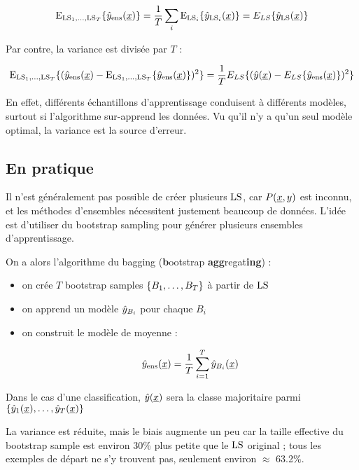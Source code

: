 	$$\text{E}_{\text{LS}_1, \dots , \text{LS}_T} \lbrace \hat{y}_{\text{ens}} (\underline{x}) \rbrace = \frac{1}{T} \sum_i \text{E}_{\text{LS}_i}\lbrace \hat{y}_{\text{LS}_i}(\underline{x}) \rbrace = E_{LS}\{\hat{y}_{\text{LS}}(\underline{x})\}$$
	
	Par contre, la variance est divisée par $T$ :
	
	$$\text{E}_{\text{LS}_1, \dots , \text{LS}_T} \lbrace (\hat{y}_{\text{ens}}(\underline{x}) - \text{E}_{\text{LS}_1, \dots , \text{LS}_T} \lbrace \hat{y}_{\text{ens}}(\underline{x}) \rbrace)^2 \rbrace = \frac{1}{T} E_{LS}\{(\hat{y}(\underline{x}) - E_{LS}\{\hat{y}_{\text{ens}}(\underline{x})\})^2\}$$
	
	En effet, différents échantillons d'apprentissage conduisent à différents modèles, surtout si l'algorithme sur-apprend les données. Vu qu'il n'y a qu'un seul modèle optimal, la variance est la source d'erreur.
	
	
	\subsection{En pratique}
	
	Il n'est généralement pas possible de créer plusieurs $\text{LS}$, car $P(\underline{x}, y)$ est inconnu, et les méthodes d'ensembles nécessitent justement beaucoup de données. L'idée est d'utiliser du bootstrap sampling pour générer plusieurs ensembles d'apprentissage.

	
	On a alors l'algorithme du bagging (\textbf{b}ootstrap \textbf{agg}regat\textbf{ing}) :
	
	\begin{itemize}
		\item on crée $T$ bootstrap samples $\lbrace B_1, \dots , B_T \rbrace$ à partir de $\text{LS}$
		\item on apprend un modèle $\hat{y}_{B_i}$ pour chaque $B_i$
		\item on construit le modèle de moyenne :
		
		$$\hat{y}_{\text{ens}}(\underline{x}) = \frac{1}{T} \sum_{i = 1}^T \hat{y}_{B_i}(\underline{x})$$
	\end{itemize}
	
	
	Dans le cas d'une classification, $\hat{y}(\underline{x})$ sera la classe majoritaire parmi $\lbrace \hat{y}_1(\underline{x}), \dots , \hat{y}_T(\underline{x}) \rbrace$

	
	La variance est réduite, mais le biais augmente un peu car la taille effective du bootstrap sample est environ 30\% plus petite que le $\text{LS}$ original ; tous les exemples de départ ne s'y trouvent pas, seulement environ $\approx$ 63.2\%.
	
